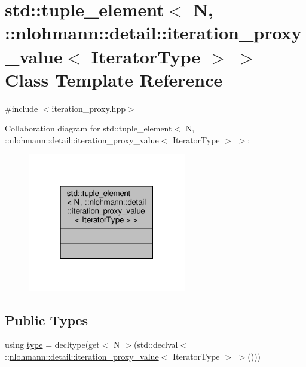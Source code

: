 \hypertarget{classstd_1_1tuple__element_3_01_n_00_01_1_1nlohmann_1_1detail_1_1iteration__proxy__value_3_01_iterator_type_01_4_01_4}{}\section{std\+:\+:tuple\+\_\+element$<$ N, \+:\+:nlohmann\+:\+:detail\+:\+:iteration\+\_\+proxy\+\_\+value$<$ Iterator\+Type $>$ $>$ Class Template Reference}
\label{classstd_1_1tuple__element_3_01_n_00_01_1_1nlohmann_1_1detail_1_1iteration__proxy__value_3_01_iterator_type_01_4_01_4}


{\ttfamily \#include $<$iteration\+\_\+proxy.\+hpp$>$}



Collaboration diagram for std\+:\+:tuple\+\_\+element$<$ N, \+:\+:nlohmann\+:\+:detail\+:\+:iteration\+\_\+proxy\+\_\+value$<$ Iterator\+Type $>$ $>$\+:
\nopagebreak
\begin{figure}[H]
\begin{center}
\leavevmode
\includegraphics[width=196pt]{classstd_1_1tuple__element_3_01_n_00_01_1_1nlohmann_1_1detail_1_1iteration__proxy__value_3_01_it98cc9de5352114567d40cb05e7e223f0}
\end{center}
\end{figure}
\subsection*{Public Types}
\begin{DoxyCompactItemize}
\item 
using \hyperlink{classstd_1_1tuple__element_3_01_n_00_01_1_1nlohmann_1_1detail_1_1iteration__proxy__value_3_01_iterator_type_01_4_01_4_ace1dfdb74841c2f58c064a50598188fd}{type} = decltype(get$<$ N $>$(std\+::declval$<$ \+::\hyperlink{classnlohmann_1_1detail_1_1iteration__proxy__value}{nlohmann\+::detail\+::iteration\+\_\+proxy\+\_\+value}$<$ Iterator\+Type $>$ $>$()))
\end{DoxyCompactItemize}



